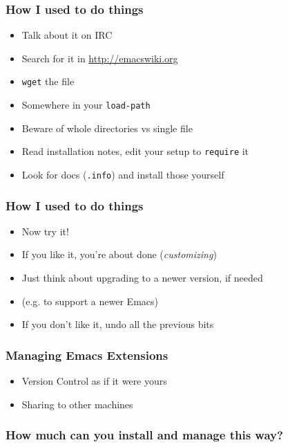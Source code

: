 \documentclass{beamer}
\begin{document}
\begin{frame}
  \frametitle{How I used to do things}
  
  \vfill

  \begin{itemize}
  \item Talk about it on IRC
  \item Search for it in \url{http://emacswiki.org}
  \item \texttt{wget} the file
  \item Somewhere in your \texttt{load-path}
  \item Beware of whole directories vs single file
  \item Read installation notes, edit your setup to \texttt{require} it
  \item Look for docs (\texttt{.info}) and install those yourself
  \end{itemize}  
\end{frame}

\begin{frame}
  \frametitle{How I used to do things}
  
  \vfill

  \begin{itemize}
  \item Now try it!
  \item If you like it, you're about done (\textit{customizing})
  \item Just think about upgrading to a newer version, if needed
  \item (e.g. to support a newer Emacs)
  \item If you don't like it, undo all the previous bits
  \end{itemize}  
\end{frame}

\begin{frame}
  \frametitle{Managing Emacs Extensions}
  
  \vfill

  \begin{itemize}
  \item Version Control as if it were yours
  \item Sharing to other machines
  \end{itemize}  
\end{frame}

\begin{frame}
  \frametitle{How much can you install and manage this way?}
  

\end{frame}
\end{document}

